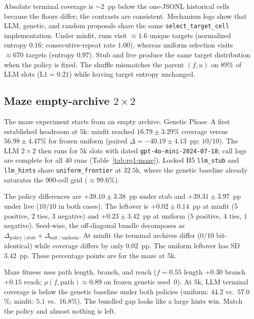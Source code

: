 \documentclass[preprint,12pt]{elsarticle}
\begin{document}
Absolute terminal coverage is ${\sim}2$~pp below the one-JSONL historical cells because the floors differ; the contrasts are consistent. Mechanism logs show that LLM, genetic, and random proposals share the same \texttt{select\_target\_cell} implementation. Under minfit, runs visit ${\approx}1.6$ unique targets (normalized entropy $0.16$; consecutive-repeat rate $1.00$), whereas uniform selection visits ${\approx}670$ targets (entropy $0.97$). Stub and live produce the same target distribution when the policy is fixed. The shuffle mismatches the parent $(f,u)$ on $89\%$ of LLM slots ($\mathrm{L1}{=}0.21$) while leaving target entropy unchanged.

\subsection{Maze empty-archive $2\times2$}
\label{sec:rq1-maze}
The maze experiment starts from an empty archive. Genetic Phase~A first established headroom at $5$k: minfit reached $16.79 \pm 3.29$\% coverage versus $56.98 \pm 4.47$\% for frozen uniform (paired $\Delta{=}{-}40.19 \pm 4.13$~pp; $10/10$). The LLM $2\times2$ then runs for $5$k slots with dated \texttt{gpt-4o-mini-2024-07-18}; call logs are complete for all $40$ runs (Table~\ref{tab:rq1-maze}). Locked H5 \texttt{llm\_stub} and \texttt{llm\_hints} share \texttt{uniform\_frontier} at $32.5$k, where the genetic baseline already saturates the $900$-cell grid (${\approx}99.6\%$).

The policy differences are $+39.10 \pm 3.38$~pp under stub and $+39.31 \pm 3.97$~pp under live ($10/10$ in both cases). The leftover is $+0.02 \pm 0.14$~pp at minfit ($5$ positive, $2$ ties, $3$ negative) and $+0.23 \pm 3.42$~pp at uniform ($5$ positive, $4$ ties, $1$ negative). Seed-wise, the off-diagonal bundle decomposes as $\Delta_{\mathrm{policy}\mid\mathrm{stub}}+\Delta_{\mathrm{soft}\mid\mathrm{uniform}}$. At minfit the terminal archives differ ($0/10$ bit-identical) while coverage differs by only $0.02$~pp. The uniform leftover has SD $3.42$~pp. These percentage points are for the maze at $5$k.

Maze fitness uses path length, branch, and reach ($f{=}0.55$ length $+0.30$ branch $+0.15$ reach; $\rho(f,\mathrm{path}){\approx}0.89$ on frozen genetic seed~0). At $5$k, LLM terminal coverage is below the genetic baseline under both policies (uniform: $44.2$ vs.\ $57.0$\%; minfit: $5.1$ vs.\ $16.8$\%). The bundled gap looks like a large hints win. Match the policy and almost nothing is left.
\end{document}
